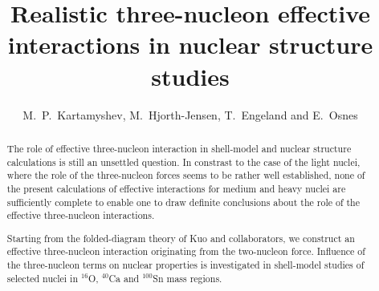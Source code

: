 \documentclass[preprint,aps]{revtex4}
\begin{document}
\title{Realistic three-nucleon effective interactions in nuclear structure studies}

\author{M.~P.~Kartamyshev, M.~Hjorth-Jensen, T.~Engeland and E.~Osnes}



\begin{abstract}
The role of effective three-nucleon interaction in shell-model and nuclear structure calculations
is still an unsettled question. In constrast to the case of the light nuclei,
where the role of the three-nucleon forces seems to be rather well established, none of the present
calculations of effective interactions for medium and heavy nuclei are sufficiently complete to
enable one to draw definite conclusions about the role of the effective three-nucleon interactions. 

Starting from the folded-diagram theory of Kuo and collaborators, we construct an effective
three-nucleon interaction originating from the two-nucleon force. Influence of the three-nucleon
terms on nuclear properties is investigated in shell-model studies of selected nuclei in $^{16}$O,
$^{40}$Ca and $^{100}$Sn mass regions.
\end{abstract}


\maketitle
\end{document}
